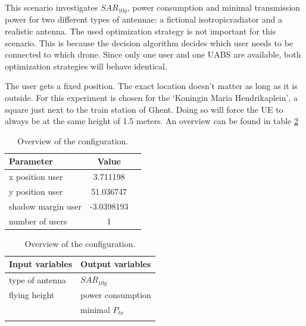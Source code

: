 This scenario investigates $SAR_{10g}$, power consumption and minimal transmission power for two different types of antennae: a 
 fictional \gls{isotropicradiator} and a realistic antenna.
 The used optimization strategy is not important
for this scenario. This is because the
 decision algorithm decides which user needs to be connected to which drone. Since only one user and one
\gls{UABS} are available, both optimization strategies will behave identical. 

The user gets a fixed position. The exact location doesn't matter as long as it is outside. For this experiment is chosen for the 
`Koningin Maria Hendrikaplein', a square just next to the train station of Ghent.  Doing so will force the \gls{UE} 
to always be at the same height of 1.5 meters. An overview can be found in table \ref{table:confOverviewScenario1}

\begin{table}[!htb]
    \begin{minipage}{.5\linewidth}
      \centering
        \begin{tabular}{|l|c|l|}
        \hline
        \textbf{Parameter}              & \textbf{Value}          \\   \hline 
        x position user               & 3.711198       \\    
        y position user               & 51.036747          \\ 
        shadow margin user             & -3.0398193 \\
        number of users                & 1 \\
        \hline
        \end{tabular}
    \end{minipage}%
    \begin{minipage}{.5\linewidth}
      \centering
            \begin{tabular}{|l|l|}
            \hline
            \textbf{Input variables  }              & \textbf{Output variables}          \\   \hline 
            type of antenna                & $SAR_{10g}$               \\ 
            flying height                  & power consumption             \\ 
                                           &  minimal $P_{tx}$ \\ 
                                           & \\
            \hline
            \end{tabular}
    \end{minipage} 
        \caption{Overview of the configuration.}
        \label{table:confOverviewScenario1}
\end{table}

